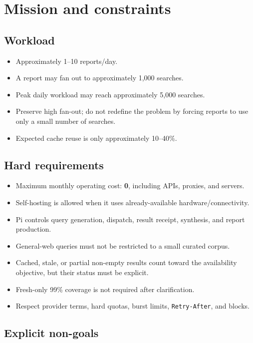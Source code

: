 \documentclass[11pt]{article}
\begin{document}
\section*{Mission and constraints}
\label{sec:orgc0adea0}

\subsection*{Workload}
\label{sec:org60c92c4}

\begin{itemize}
\item Approximately 1--10 reports/day.
\item A report may fan out to approximately 1,000 searches.
\item Peak daily workload may reach approximately 5,000 searches.
\item Preserve high fan-out; do not redefine the problem by forcing reports to use
only a small number of searches.
\item Expected cache reuse is only approximately 10--40\%.
\end{itemize}
\subsection*{Hard requirements}
\label{sec:orgb3a22c0}

\begin{itemize}
\item Maximum monthly operating cost: \textbf{0}, including APIs, proxies, and servers.
\item Self-hosting is allowed when it uses already-available hardware/connectivity.
\item Pi controls query generation, dispatch, result receipt, synthesis, and report
production.
\item General-web queries must not be restricted to a small curated corpus.
\item Cached, stale, or partial non-empty results count toward the availability
objective, but their status must be explicit.
\item Fresh-only 99\% coverage is not required after clarification.
\item Respect provider terms, hard quotas, burst limits, \texttt{Retry-After}, and blocks.
\end{itemize}
\subsection*{Explicit non-goals}
\label{sec:org34bbcd6}
\end{document}
